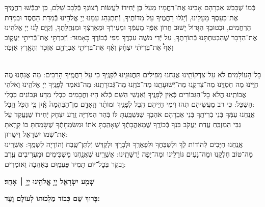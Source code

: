 \documentclass[twoside, openany, parskip=half, 11pt]{book}
\begin{document}
כְּֿמוֹ שֶׁכָּבַשׁ אַבְרָהָם אָבִינוּ אֶת־רַחֲמָיו מֵעַל בֶּן יְֿחִידוֹ לַעֲשׂוֹת רְֿצוֹנְךָ בְּֿלֵבָב שָׁלֵם, כֵּן יִכְבְּֿֿשׁוּ רַחֲמֶיךָ אֶת־כַּעַסְךָ מֵעָלֵינוּ, וְֿיָגֹלּוּ רַחֲמֶיךָ עַל מִדּוֹתֶיךָ, וְֿתִתְנַהֵג עִמָּנוּ יְיָ אֱלֹהֵינוּ בְּֿמִדַּת הַחֶסֶד וּבְמִדַּת הָרַחֲמִים, וּבְטוּבְךָ הַגָּדוֹל יָשׁוּב חֲרוֹן אַפְּֿךָ מֵעַמְּֿךָ וּמֵעִירְֿךָ וּמֵאַרְצְֿךָ וּמִנַּחֲלָתֶךָ, וְֿקַיֶּם לָנוּ יְיָ אֱלֹהֵינוּ אֶת־הַדָּבָר שֶׁהִבְטַחְתָּנוּ בְּֿתוֹרָתֶךָ, עַל יְֿדֵי משֶׁה עַבְדֶּךָ מִפִּי כְֿבוֹדֶךָ כָּאָמוּר: וְֿזָכַרְתִּ֖י אֶת־בְּֿרִיתִ֣י יַעֲק֑וֹב וְֿאַף֩ אֶת־בְּֿרִיתִ֨י יִצְחָ֜ק וְֿאַ֨ף אֶת־בְּֿרִיתִ֧י אַבְרָהָ֛ם אֶזְכֹּ֖ר וְֿהָאָ֥רֶץ אֶזְכֹּֽר׃\\
\\

כׇּל־הָעוֹלָמִים לֹא עַל־צִדְקוֹתֵֽינוּ אֲנַֽחְנוּ מַפִּילִים תַּחֲנוּנֵֽינוּ לְֿפָנֶֽיךָ כִּי עַל רַחֲמֶֽיךָ הָרַבִּים: מָה אֲנַחְנוּ מֶה חַיֵּֽינוּ מֶה חַסְדֵּֽנוּ מַה־צִּדְקֵֽנוּ מַה־יְּֿֿשׁוּעָתֵֽנוּ מַה־כֹּחֵֽנוּ מַה־גְּֿֿבוּרָתֵֽנוּ: מַה־נֹּאמַר לְֿפָנֶֽיךָ יְיָ אֱלֹהֵֽינוּ וֵאלֹהֵי אֲבוֹתֵֽינוּ הֲלֹא כׇל־הַגִּבּוֹרִים כְּֿאַֽיִן לְֿפָנֶֽיךָ וְֿאַנְשֵׁי הַשֵּׁם כְּֿלֹא הָיוּ וַחֲכָמִים כִּבְלִי מַדָּע וּנְבוֹנִים כִּבְלִי הַשְׂכֵּל: כִּי רֹב מַעֲשֵׂיהֶם תֹּֽהוּ וִימֵי חַיֵּיהֶם הֶֽבֶל לְֿפָנֶֽיךָ וּמוֹתַ֨ר הָֽאָדָ֤ם מִן־הַבְּֿהֵמָה֙ אָֽ֔יִן כִּ֥י הַכֹּ֖ל הָֽבֶל: \\
אֲנַֽחְנוּ עַמְּֿךָ בְּֿנֵי בְֿרִיתֶֽךָ בְּֿנֵי אַבְרָהָם אֹהַבְךָ שֶׁנִּשְׁבַּֽעְתָּ לּוֹ בְּֿהַר הַמֹּרִיָּה זֶֽרַע יִצְחָק יְֿחִידוֹ שֶׁנֶּעֱקַד עַל גַּבֵּי הַמִּזְבֵּֽחַ עֲדַת יַעֲקֹב בִּנְךָ בְּֿכוֹרֶֽךָ שֶׁמֵּאַהֲבָתְֿךָ שֶׁאָהַֽבְתָּ אֹתוֹ וּמִשִּׂמְחָתְֿךָ שֶׁשָּׂמַֽחְתָּ בּוֹ קָרָֽאתָ אֶת־שְֿׁמוֹ יִשְׂרָאֵל וִישֻׁרוּן: \\
אֲנַֽחְנוּ חַיָּבִים לְֿהוֹדוֹת לְֿךָ וּלְשַׁבֵּחֲךָ וּלְפָאֶרְֽךָ וּלְבָרֵךְ וּלְקַדֵּשׁ וְֿלִתֵּן־שֶֽׁבַח וְֿהוֹדָיָה לִשְׁמֶֽךָ: אַשְׁרֵֽינוּ מַה־טּוֹב חֶלְקֵֽנוּ וּמַה־נָּעִים גּוֹרָלֵֽינוּ וּמַה־יָּפָה יְֿרֻשָּׁתֵֽינוּ: אַשְׁרֵֽינוּ שֶׁאֲנַֽחְנוּ מַשְׁכִּימִים וּמַעֲרִיבִים עֶֽרֶב וָבֹֽקֶר בְּֿכׇל־יוֹם תָּמִיד פַּעֲמַֽיִם בְּֿאַהֲבָה וְֿאוֹמְֿרִים:

\begin{Large}
\textbf{שְׁמַ֖ע יִשְׂרָאֵ֑ל יְיָ֥ אֱלֹהֵ֖ינוּ יְיָ֥ ׀ אֶחָֽד׃}
\end{Large}

\textbf{%
בָּרוּךְ שֵׁם כְּֿבוֹד מַלְכוּתוֹ לְֿעוֹלָם וָעֶד:
}
\end{document}
